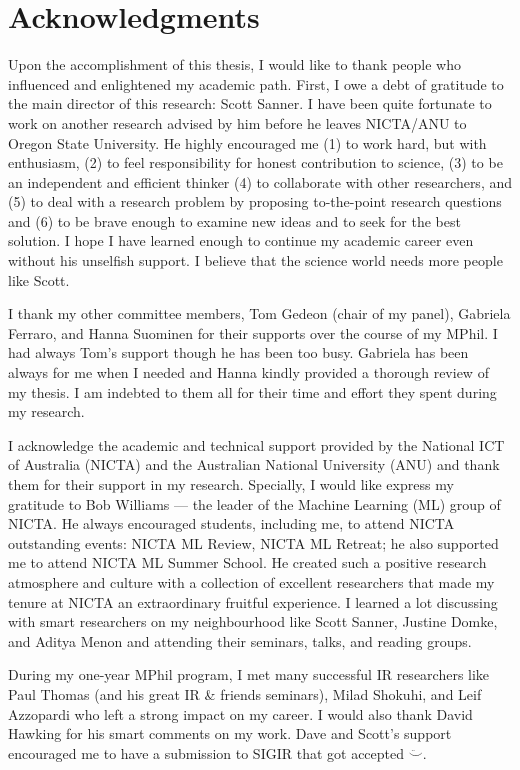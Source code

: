 \chapter*{Acknowledgments}

Upon the accomplishment of this thesis, I would like to thank people who influenced and enlightened my academic path. 
First, I owe a debt of gratitude to the main director of this research: Scott Sanner. I have been quite fortunate to work on another research advised by him before he leaves NICTA/ANU to Oregon State University. He highly encouraged me  (1) to work hard, but with enthusiasm, (2) to feel responsibility for honest contribution to science, (3) to be an independent and efficient thinker (4)  to collaborate with other researchers, and (5) to deal with a research problem by proposing to-the-point research questions and (6) to be brave enough to examine new ideas and to seek for the best solution. I hope I have learned enough to continue my academic career even without his unselfish support. I believe that the science world needs more people like Scott. 

I thank my other committee members, Tom Gedeon (chair of my panel), Gabriela Ferraro, and Hanna Suominen for their supports over the course of my MPhil. I had always Tom's support though he has been too busy. Gabriela has been always for me when I needed and Hanna kindly provided a thorough review of my thesis. 
I am indebted to them all for their time and effort they spent during my research. 

I acknowledge the academic and technical support provided by the
National ICT of Australia (NICTA) and the Australian National University (ANU)
and thank them for their support in my research. Specially, I would like express my gratitude to Bob Williams --- the leader of the Machine Learning (ML) group of NICTA. He always encouraged students, including me, to attend NICTA outstanding events: NICTA ML Review, NICTA ML Retreat; he also supported me to attend NICTA ML Summer School. He created such a positive research atmosphere and culture with a collection of excellent researchers that made my tenure at NICTA an extraordinary fruitful experience. I learned a lot discussing with smart researchers on my neighbourhood like Scott Sanner, Justine Domke, and Aditya Menon and attending their seminars, talks, and reading groups. 

During my one-year MPhil program, I met many successful IR researchers like Paul Thomas (and his great IR \& friends seminars), Milad Shokuhi, and Leif Azzopardi who left a strong impact on my career. I would also thank David Hawking for his smart comments on my work. Dave and Scott's support encouraged me to have a submission to SIGIR that got accepted $\ddot\smile$. 

